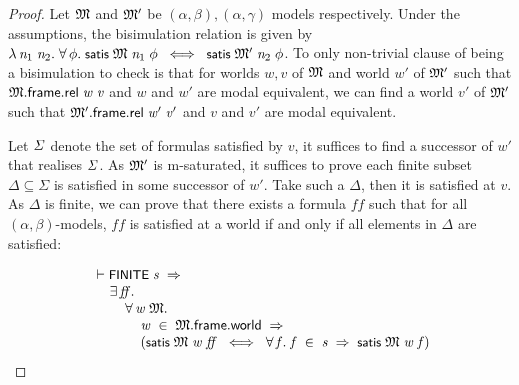 \documentclass[letterpaper]{article}
\renewcommand{\HOLConst}[1]{{\textsf{\upshape\small #1}}}
\renewcommand{\HOLinline}[1]{\ensuremath{#1}}
\newenvironment{holmath}{\begin{displaymath}\begin{array}{l}}{\end{array}\end{displaymath}\ignorespacesafterend}
\begin{document}
\begin{proof}
Let \HOLinline{\HOLFreeVar{\ensuremath{\mathfrak{M}}}} and \HOLinline{\HOLFreeVar{\ensuremath{\mathfrak{M}'}}} be $(\alpha,\beta),(\alpha,\gamma)$ models respectively. Under the assumptions, the bisimulation relation is given by \HOLinline{\HOLTokenLambda{}\HOLBoundVar{n\sb{\mathrm{1}}}\;\HOLBoundVar{n\sb{\mathrm{2}}}.\;\HOLSymConst{\HOLTokenForall{}}\HOLBoundVar{\ensuremath{\phi}}.\;\HOLConst{satis}\;\HOLFreeVar{\ensuremath{\mathfrak{M}}}\;\HOLBoundVar{n\sb{\mathrm{1}}}\;\HOLBoundVar{\ensuremath{\phi}}\;\HOLSymConst{\HOLTokenEquiv{}}\;\HOLConst{satis}\;\HOLFreeVar{\ensuremath{\mathfrak{M}'}}\;\HOLBoundVar{n\sb{\mathrm{2}}}\;\HOLBoundVar{\ensuremath{\phi}}}. To only non-trivial clause of being a bisimulation to check is that for worlds $w,v$ of \HOLinline{\HOLFreeVar{\ensuremath{\mathfrak{M}}}} and world $w'$ of \HOLinline{\HOLFreeVar{\ensuremath{\mathfrak{M}'}}} such that \HOLinline{\HOLFreeVar{\ensuremath{\mathfrak{M}}}.\HOLFieldName{frame}.\HOLFieldName{rel}\;\HOLFreeVar{w}\;\HOLFreeVar{v}} and $w$ and $w'$ are modal equivalent, we can find a world $v'$ of \HOLinline{\HOLFreeVar{\ensuremath{\mathfrak{M}'}}} such that \HOLinline{\HOLFreeVar{\ensuremath{\mathfrak{M}'}}.\HOLFieldName{frame}.\HOLFieldName{rel}\;\HOLFreeVar{w\sp{\prime}}\;\HOLFreeVar{v\sp{\prime}}} and $v$ and $v'$ are modal equivalent. 

Let \HOLinline{\HOLFreeVar{\ensuremath{\Sigma}}} denote the set of formulas satisfied by $v$, it suffices to find a successor of $w'$ that realises \HOLinline{\HOLFreeVar{\ensuremath{\Sigma}}}. As \HOLinline{\HOLFreeVar{\ensuremath{\mathfrak{M}'}}} is m-saturated, it suffices to prove each finite subset $\Delta\subseteq \Sigma$ is satisfied in some successor of $w'$. Take such a $\Delta$, then it is satisfied at $v$. As $\Delta$ is finite, we can prove that there exists a formula $ff$ such that for all $(\alpha,\beta)$-models, $ff$ is satisfied at a world if and only if all elements in $\Delta$ are satisfied:

\begin{holmath}
  \ensuremath{\HOLTokenTurnstile}\HOLConst{FINITE}\;\HOLFreeVar{s}\;\HOLSymConst{\HOLTokenImp{}}\\
\;\;\;\;\;\HOLSymConst{\HOLTokenExists{}}\HOLBoundVar{ff}.\\
\;\;\;\;\;\;\;\;\;\HOLSymConst{\HOLTokenForall{}}\HOLBoundVar{w}\;\HOLBoundVar{\ensuremath{\mathfrak{M}}}.\\
\;\;\;\;\;\;\;\;\;\;\;\;\;\HOLBoundVar{w}\;\HOLSymConst{\HOLTokenIn{}}\;\HOLBoundVar{\ensuremath{\mathfrak{M}}}.\HOLFieldName{frame}.\HOLFieldName{world}\;\HOLSymConst{\HOLTokenImp{}}\\
\;\;\;\;\;\;\;\;\;\;\;\;\;(\HOLConst{satis}\;\HOLBoundVar{\ensuremath{\mathfrak{M}}}\;\HOLBoundVar{w}\;\HOLBoundVar{ff}\;\HOLSymConst{\HOLTokenEquiv{}}\;\HOLSymConst{\HOLTokenForall{}}\HOLBoundVar{f}.\;\HOLBoundVar{f}\;\HOLSymConst{\HOLTokenIn{}}\;\HOLFreeVar{s}\;\HOLSymConst{\HOLTokenImp{}}\;\HOLConst{satis}\;\HOLBoundVar{\ensuremath{\mathfrak{M}}}\;\HOLBoundVar{w}\;\HOLBoundVar{f})
\end{holmath}


\end{proof}
\end{document}
